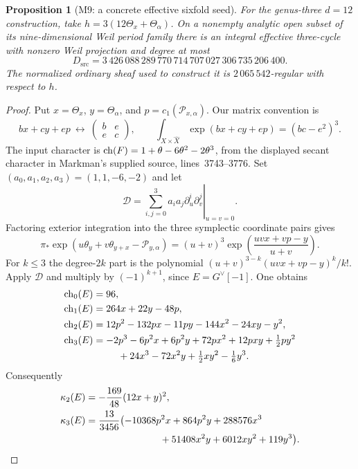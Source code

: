 \documentclass[11pt,a4paper]{article}
\newtheorem{proposition}[theorem]{Proposition}
\theoremstyle{definition}\newtheorem{definition}[theorem]{Definition}
\theoremstyle{remark}\newtheorem{remark}[theorem]{Remark}
\begin{document}
\begin{proposition}[M9: a concrete effective sixfold seed]\label{M9}
For the genus-three $d=12$ construction, take
$h=3(12\Theta_x+\Theta_\alpha)$. On a nonempty analytic open subset
of its nine-dimensional Weil period family there is an integral
effective three-cycle with nonzero Weil projection and degree at most
\begin{equation}\label{eq:M9Dsource}
 D_{\mathrm{src}}=
 3\,426\,088\,289\,770\,714\,707\,027\,306\,735\,206\,400.
\end{equation}
The normalized ordinary sheaf used to construct it is
$2\,065\,542$-regular with respect to $h$.
\end{proposition}
\begin{proof}
Put $x=\Theta_x$, $y=\Theta_\alpha$, and
$p=c_1(\mathcal P_{x,\alpha})$. Our matrix convention is
\[
 bx+cy+ep\ \longleftrightarrow\
 \begin{pmatrix}b&e\\e&c\end{pmatrix},\qquad
 \int_{X\times\widehat X}\exp(bx+cy+ep)=(bc-e^2)^3.
\]
The input character is
$\operatorname{ch}(F)=1+\theta-6\theta^2-2\theta^3$, from the displayed secant
character in Markman's supplied source, lines~3743--3776.
Set $(a_0,a_1,a_2,a_3)=(1,1,-6,-2)$ and let
\[
 \mathcal D=\left.
       \sum_{i,j=0}^3 a_i a_j\partial_u^i\partial_v^j
       \right|_{u=v=0}.
\]
Factoring exterior integration into the three symplectic coordinate
pairs gives
\[
 \pi_*\exp(u\theta_y+v\theta_{y+x}-\mathcal P_{y,\alpha})
 =(u+v)^3
       \exp\left(\frac{uvx+vp-y}{u+v}\right).
\]
For $k\le3$ the degree-$2k$ part is the polynomial
$(u+v)^{3-k}(uvx+vp-y)^k/k!$. Apply $\mathcal D$ and multiply
by $(-1)^{k+1}$, since $E=G^\vee[-1]$. One obtains
\begin{align*}
 \operatorname{ch}_0(E)&=96,\\
 \operatorname{ch}_1(E)&=264x+22y-48p,\\
 \operatorname{ch}_2(E)&=12p^2-132px-11py-144x^2-24xy-y^2,\\
 \operatorname{ch}_3(E)&=-2p^3-6p^2x+6p^2y+72px^2+12pxy+\tfrac12py^2\\
          &\hspace{9mm}+24x^3-72x^2y+\tfrac12xy^2-\tfrac16y^3.
\end{align*}
Consequently
\begin{align}
 \kappa_2(E)&=-\frac{169}{48}(12x+y)^2,\label{eq:M9kappa2}\\
 \kappa_3(E)&=\frac{13}{3456}
 \bigl(-10368p^2x+864p^2y+288576x^3\nonumber\\
 &\hspace{27mm}+51408x^2y+6012xy^2+119y^3\bigr).
 \label{eq:M9kappa3}
\end{align}


\end{proof}
\end{document}
